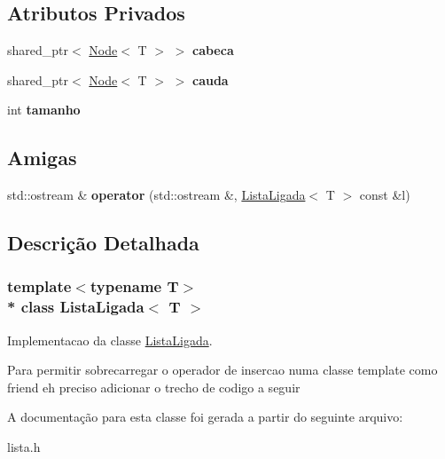 \subsection*{Atributos Privados}
\begin{DoxyCompactItemize}
\item 
shared\+\_\+ptr$<$ \hyperlink{classNode}{Node}$<$ T $>$ $>$ {\bfseries cabeca}\hypertarget{classListaLigada_a8923b88a26191809b8ffc8181dc20359}{}\label{classListaLigada_a8923b88a26191809b8ffc8181dc20359}

\item 
shared\+\_\+ptr$<$ \hyperlink{classNode}{Node}$<$ T $>$ $>$ {\bfseries cauda}\hypertarget{classListaLigada_a7fbadfbdd19c26712c4f1045a7782804}{}\label{classListaLigada_a7fbadfbdd19c26712c4f1045a7782804}

\item 
int {\bfseries tamanho}\hypertarget{classListaLigada_a7cb56d42e0603821e0b8f8645ec55ba0}{}\label{classListaLigada_a7cb56d42e0603821e0b8f8645ec55ba0}

\end{DoxyCompactItemize}
\subsection*{Amigas}
\begin{DoxyCompactItemize}
\item 
std\+::ostream \& {\bfseries operator} (std\+::ostream \&, \hyperlink{classListaLigada}{Lista\+Ligada}$<$ T $>$ const \&l)\hypertarget{classListaLigada_a39cff4b79a3afa0ae93c15e24359f04c}{}\label{classListaLigada_a39cff4b79a3afa0ae93c15e24359f04c}

\end{DoxyCompactItemize}


\subsection{Descrição Detalhada}
\subsubsection*{template$<$typename T$>$\\*
class Lista\+Ligada$<$ T $>$}

Implementacao da classe \hyperlink{classListaLigada}{Lista\+Ligada}. 

Para permitir sobrecarregar o operador de insercao numa classe template como friend eh preciso adicionar o trecho de codigo a seguir 

A documentação para esta classe foi gerada a partir do seguinte arquivo\+:\begin{DoxyCompactItemize}
\item 
lista.\+h\end{DoxyCompactItemize}

